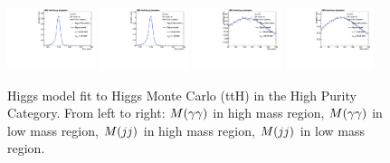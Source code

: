\begin{figure}[h]
  \centering
\includegraphics[width=0.23\textwidth]{figures/sec-signals/HiggsShapes/tth_HM_signal_fit_mgg_cat0.pdf}
\includegraphics[width=0.23\textwidth]{figures/sec-signals/HiggsShapes/tth_LM_signal_fit_mgg_cat0.pdf}
\includegraphics[width=0.23\textwidth]{figures/sec-signals/HiggsShapes/tth_HM_signal_fit_mjj_cat0.pdf}
\includegraphics[width=0.23\textwidth]{figures/sec-signals/HiggsShapes/tth_LM_signal_fit_mjj_cat0.pdf}
  \caption{Higgs model fit to Higgs Monte Carlo (ttH) in the High Purity Category. From left to right: $M(\gamma\gamma)$ in high mass region, $M(\gamma\gamma)$ in low mass region, $M(jj)$ in high mass region, $M(jj)$ in low mass region.}
  \label{fig:higgs_fit_tth}
\end{figure}



